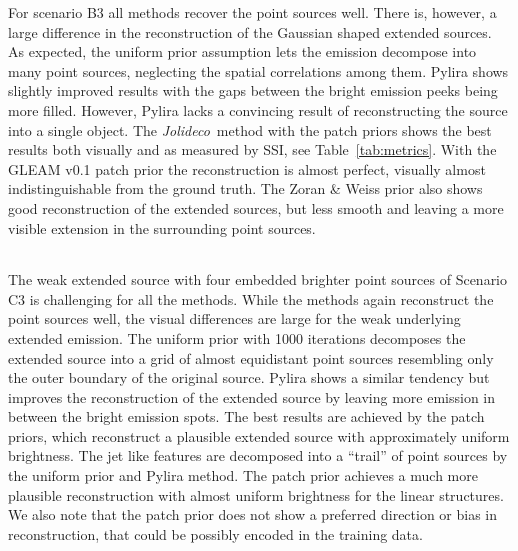 \documentclass[twocolumn, lineno]{aastex631}
\newcommand{\jolideco}{\textit{Jolideco}~}
\begin{document}
    For scenario B3 all methods recover the point sources well.  There is, however, a large difference  in the reconstruction of the Gaussian shaped extended sources. As expected, the uniform prior assumption lets the emission decompose into many point sources, neglecting the spatial correlations among them. Pylira shows slightly improved results with the gaps between the bright emission peeks being more filled. However, Pylira lacks a convincing result of reconstructing the source into a single object. The \jolideco method with the patch priors shows the best results both visually and as measured by SSI, see Table~\ref{tab:metrics}. With the GLEAM v0.1 patch prior the reconstruction is almost perfect, visually almost indistinguishable from the ground truth. The Zoran \& Weiss prior also shows good reconstruction of the extended sources, but less smooth and leaving a more visible extension in the surrounding point sources.
    \begin{table*}
    \centering
        \begin{tabular}{ c|c|c|c|c|c } 
            
        \end{tabular}
        \label{tab:metrics}
        \caption{Image metrics for the different source scenarios and methods shown in Figure~\ref{fig:comparison-scenarios}. The first number in a cell shows the structural similarity index (SSI, the closer to unity, the better) and the second number shows the normalized root mean square (NRMSE, the lower the better).}
    \end{table*}
    The weak extended source with four embedded brighter point sources of Scenario C3 is challenging for all the methods. While the methods again reconstruct the point sources well, the visual differences are large for the weak underlying extended emission. The uniform prior with 1000 iterations decomposes the extended source into a grid of almost equidistant point sources resembling only the outer boundary of the original source. Pylira shows a similar tendency but improves the reconstruction of the extended source by leaving more emission in between the bright emission spots. The best results are achieved by the patch priors, which reconstruct a plausible extended source with approximately uniform brightness. The jet like features are decomposed into a \enquote{trail} of point sources by the uniform prior and Pylira method. The patch prior achieves a much more plausible reconstruction with almost uniform brightness for the linear structures. We also note that the patch prior does not show a preferred direction or bias in reconstruction, that could be possibly encoded in the training data.
    
\end{document}
